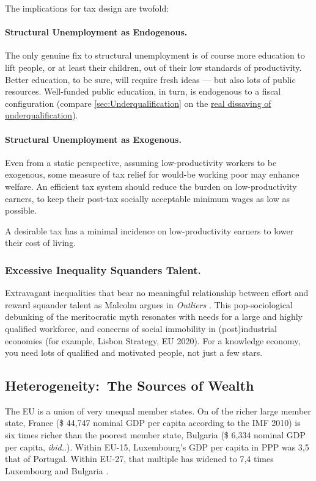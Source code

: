The implications for tax design are twofold:

\paragraph{Structural Unemployment as Endogenous.}
The only genuine fix to structural unemployment is of course more education to lift people, or at least their children, out of their low standards of productivity.
Better education, to be sure, will require fresh ideas --- but also lots of public resources.
Well-funded public education, in turn, is endogenous to a fiscal configuration (compare \autoref{sec:Underqualification} on the \hyperref[sec:Underqualification]{real dissaving of underqualification}).

\paragraph{Structural Unemployment as Exogenous.}
Even from a static perspective, assuming low-productivity workers to be exogenous, some measure of tax relief for would-be working poor may enhance welfare.
An efficient tax system should reduce the burden on low-productivity earners, to keep their post-tax socially acceptable minimum wages as low as possible.
\newpage
\begin{desideratum}
	\label{des:low-price-floor}
	A desirable tax has a minimal incidence on low-productivity earners to lower their cost of living.
\end{desideratum}

\subsubsection{Excessive Inequality Squanders Talent.}
Extravagant inequalities that bear no meaningful relationship between effort and reward squander talent as Malcolm \citeauthor{Gladwell} argues in \emph{Outliers} \citeyearpar{Gladwell}.
This pop-sociological debunking of the meritocratic myth resonates with needs
for a large and highly qualified workforce, and concerns of social immobility in (post)industrial economies (for example, Lisbon Strategy, EU 2020).
For a knowledge economy, you need lots of qualified and motivated people, not just a few stars.

\subsection[Heterogeneity]{Heterogeneity:\ The Sources of Wealth}
	\label{sec:sources-of-wealth}
The \gls{EU} is a union of very unequal member states.
On of the richer large member state, France (\$ 44,747 nominal \gls{GDP} per capita according to the IMF 2010) is six times richer than the poorest member state, Bulgaria (\$ 6,334 nominal \gls{GDP} per capita, \emph{ibid.}.).
Within \gls{EU}-15, Luxembourg's \gls{GDP} per capita in \gls{PPP} was 3,5 that of Portugal.
Within \gls{EU}-27, that multiple has widened to 7,4 times Luxembourg and Bulgaria \citep[1]{Alber2008}.

